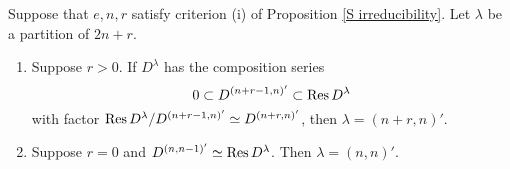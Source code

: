 \documentclass{amsart}
\begin{document}
\begin{proposition}\label{Combinatorics}
  Suppose that $e,n,r$ satisfy criterion (i) of Proposition \ref{S irreducibility}.
  Let $\lambda$ be a partition of $2n + r$.
  \begin{enumerate}[label={(\roman*)}]
    \item Suppose $r > 0$.
      If $D^\lambda$ has the composition series 
      \begin{equation}\label{D Composition Series}
        0 \subset D^{(n+r-1,n)'} \subset \text{Res} \, D^{\lambda}
      \end{equation}
      with factor $\text{Res} \, D^{\lambda} / D^{(n+r-1,n)'} \simeq D^{(n+r,n)'}$, then $\lambda = (n+r,n)'$.
    \item Suppose $r = 0$ and $D^{(n,n-1)'} \simeq \text{Res} \, D^\lambda$.
      Then $\lambda = (n,n)'$.
  \end{enumerate}
\end{proposition}
\end{document}
